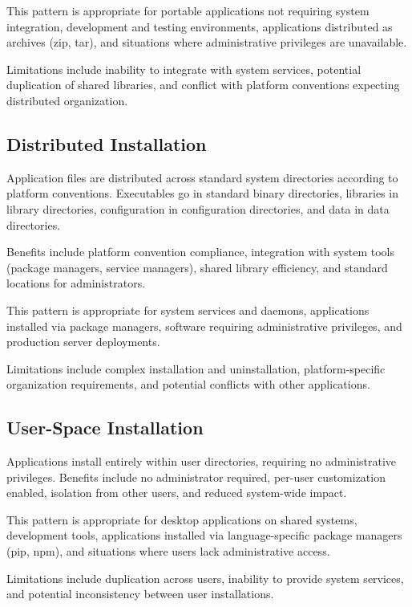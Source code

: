 \documentclass[11pt]{article}
\begin{document}
This pattern is appropriate for portable applications not requiring system integration, development and testing environments, applications distributed as archives (zip, tar), and situations where administrative privileges are unavailable.

Limitations include inability to integrate with system services, potential duplication of shared libraries, and conflict with platform conventions expecting distributed organization.

\subsection{Distributed Installation}

Application files are distributed across standard system directories according to platform conventions. Executables go in standard binary directories, libraries in library directories, configuration in configuration directories, and data in data directories.

Benefits include platform convention compliance, integration with system tools (package managers, service managers), shared library efficiency, and standard locations for administrators.

This pattern is appropriate for system services and daemons, applications installed via package managers, software requiring administrative privileges, and production server deployments.

Limitations include complex installation and uninstallation, platform-specific organization requirements, and potential conflicts with other applications.

\subsection{User-Space Installation}

Applications install entirely within user directories, requiring no administrative privileges. Benefits include no administrator required, per-user customization enabled, isolation from other users, and reduced system-wide impact.

This pattern is appropriate for desktop applications on shared systems, development tools, applications installed via language-specific package managers (pip, npm), and situations where users lack administrative access.

Limitations include duplication across users, inability to provide system services, and potential inconsistency between user installations.
\end{document}
